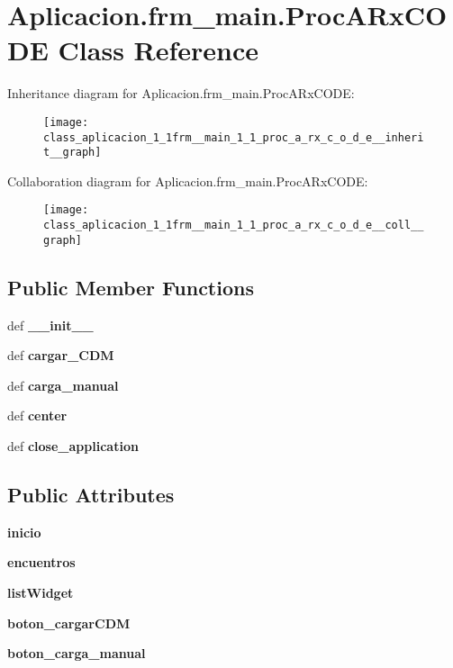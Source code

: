 \section{\-Aplicacion.\-frm\-\_\-main.\-Proc\-A\-Rx\-C\-O\-D\-E \-Class \-Reference}
\label{class_aplicacion_1_1frm__main_1_1_proc_a_rx_c_o_d_e}


\-Inheritance diagram for \-Aplicacion.\-frm\-\_\-main.\-Proc\-A\-Rx\-C\-O\-D\-E\-:\nopagebreak
\begin{figure}[H]
\begin{center}
\leavevmode
\texttt{[image: class\_aplicacion\_1\_1frm\_\_main\_1\_1\_proc\_a\_rx\_c\_o\_d\_e\_\_inherit\_\_graph]}
\end{center}
\end{figure}


\-Collaboration diagram for \-Aplicacion.\-frm\-\_\-main.\-Proc\-A\-Rx\-C\-O\-D\-E\-:\nopagebreak
\begin{figure}[H]
\begin{center}
\leavevmode
\texttt{[image: class\_aplicacion\_1\_1frm\_\_main\_1\_1\_proc\_a\_rx\_c\_o\_d\_e\_\_coll\_\_graph]}
\end{center}
\end{figure}
\subsection*{\-Public \-Member \-Functions}
\begin{DoxyCompactItemize}
\item 
def {\bf \-\_\-\-\_\-init\-\_\-\-\_\-}
\item 
def {\bf cargar\-\_\-\-C\-D\-M}
\item 
def {\bf carga\-\_\-manual}
\item 
def {\bf center}
\item 
def {\bf close\-\_\-application}
\end{DoxyCompactItemize}
\subsection*{\-Public \-Attributes}
\begin{DoxyCompactItemize}
\item 
{\bf inicio}
\item 
{\bf encuentros}
\item 
{\bf list\-Widget}
\item 
{\bf boton\-\_\-cargar\-C\-D\-M}
\item 
{\bf boton\-\_\-carga\-\_\-manual}
\end{DoxyCompactItemize}


